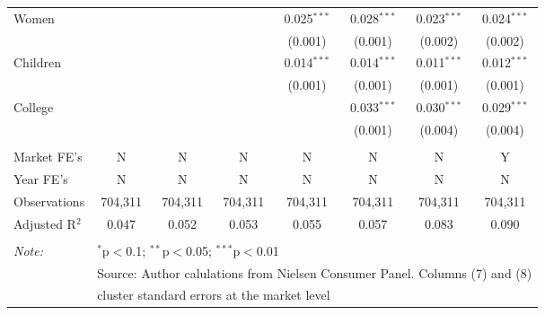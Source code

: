 \begin{table}[!htbp]
\begin{tabular}{@{\extracolsep{5pt}}lccccccc}
  Women &  &  &  & 0.025$^{***}$ & 0.028$^{***}$ & 0.023$^{***}$ & 0.024$^{***}$ \\ 
  &  &  &  & (0.001) & (0.001) & (0.002) & (0.002) \\ 
  Children &  &  &  & 0.014$^{***}$ & 0.014$^{***}$ & 0.011$^{***}$ & 0.012$^{***}$ \\ 
  &  &  &  & (0.001) & (0.001) & (0.001) & (0.001) \\ 
  College &  &  &  &  & 0.033$^{***}$ & 0.030$^{***}$ & 0.029$^{***}$ \\ 
  &  &  &  &  & (0.001) & (0.004) & (0.004) \\ 
 \hline \\[-1.8ex] 
Market FE's & N & N & N & N & N & N & Y \\ 
Year FE's & N & N & N & N & N & N & N \\ 
Observations & 704,311 & 704,311 & 704,311 & 704,311 & 704,311 & 704,311 & 704,311 \\ 
Adjusted R$^{2}$ & 0.047 & 0.052 & 0.053 & 0.055 & 0.057 & 0.083 & 0.090 \\ 
\hline 
\hline \\[-1.8ex] 
\textit{Note:}  & \multicolumn{7}{l}{$^{*}$p$<$0.1; $^{**}$p$<$0.05; $^{***}$p$<$0.01} \\ 
 & \multicolumn{7}{l}{Source: Author calulations from Nielsen Consumer Panel. Columns (7) and (8) } \\ 
 & \multicolumn{7}{l}{cluster standard errors at the market level} \\ 
\end{tabular} 
\end{table} 
